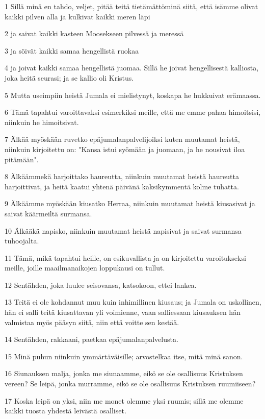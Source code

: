 \par 1 Sillä minä en tahdo, veljet, pitää teitä tietämättöminä siitä, että isämme olivat kaikki pilven alla ja kulkivat kaikki meren läpi
\par 2 ja saivat kaikki kasteen Moosekseen pilvessä ja meressä
\par 3 ja söivät kaikki samaa hengellistä ruokaa
\par 4 ja joivat kaikki samaa hengellistä juomaa. Sillä he joivat hengellisestä kalliosta, joka heitä seurasi; ja se kallio oli Kristus.
\par 5 Mutta useimpiin heistä Jumala ei mielistynyt, koskapa he hukkuivat erämaassa.
\par 6 Tämä tapahtui varoittavaksi esimerkiksi meille, että me emme pahaa himoitsisi, niinkuin he himoitsivat.
\par 7 Älkää myöskään ruvetko epäjumalanpalvelijoiksi kuten muutamat heistä, niinkuin kirjoitettu on: "Kansa istui syömään ja juomaan, ja he nousivat iloa pitämään".
\par 8 Älkäämmekä harjoittako haureutta, niinkuin muutamat heistä haureutta harjoittivat, ja heitä kaatui yhtenä päivänä kaksikymmentä kolme tuhatta.
\par 9 Älkäämme myöskään kiusatko Herraa, niinkuin muutamat heistä kiusasivat ja saivat käärmeiltä surmansa.
\par 10 Älkääkä napisko, niinkuin muutamat heistä napisivat ja saivat surmansa tuhoojalta.
\par 11 Tämä, mikä tapahtui heille, on esikuvallista ja on kirjoitettu varoitukseksi meille, joille maailmanaikojen loppukausi on tullut.
\par 12 Sentähden, joka luulee seisovansa, katsokoon, ettei lankea.
\par 13 Teitä ei ole kohdannut muu kuin inhimillinen kiusaus; ja Jumala on uskollinen, hän ei salli teitä kiusattavan yli voimienne, vaan salliessaan kiusauksen hän valmistaa myös pääsyn siitä, niin että voitte sen kestää.
\par 14 Sentähden, rakkaani, paetkaa epäjumalanpalvelusta.
\par 15 Minä puhun niinkuin ymmärtäväisille; arvostelkaa itse, mitä minä sanon.
\par 16 Siunauksen malja, jonka me siunaamme, eikö se ole osallisuus Kristuksen vereen? Se leipä, jonka murramme, eikö se ole osallisuus Kristuksen ruumiiseen?
\par 17 Koska leipä on yksi, niin me monet olemme yksi ruumis; sillä me olemme kaikki tuosta yhdestä leivästä osalliset.
